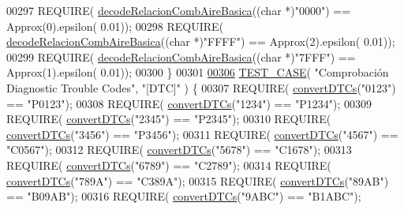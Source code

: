 \begin{DoxyCode}
{{{00297     REQUIRE( \hyperlink{decoders_8cpp_ade77bb9f8d8a2ba3aa431cdf9bdd0c32}{decodeRelacionCombAireBasica}((\textcolor{keywordtype}{char} *)\textcolor{stringliteral}{"0000"}) == Approx(0).epsilon(
      0.01));
00298     REQUIRE( \hyperlink{decoders_8cpp_ade77bb9f8d8a2ba3aa431cdf9bdd0c32}{decodeRelacionCombAireBasica}((\textcolor{keywordtype}{char} *)\textcolor{stringliteral}{"FFFF"}) == Approx(2).epsilon(
      0.01));
00299     REQUIRE( \hyperlink{decoders_8cpp_ade77bb9f8d8a2ba3aa431cdf9bdd0c32}{decodeRelacionCombAireBasica}((\textcolor{keywordtype}{char} *)\textcolor{stringliteral}{"7FFF"}) == Approx(1).epsilon(
      0.01));
00300 \}
00301 
\hyperlink{UnitTestCase_8cpp_a27f82a7800b27dd78331e6ee707cb5f8}{00306} \hyperlink{UnitTestCase_8cpp_ab1b7b485076e7de68cd9912827a8ee86}{TEST\_CASE}( \textcolor{stringliteral}{"Comprobación Diagnostic Trouble Codes"}, \textcolor{stringliteral}{"[DTC]"} ) \{
00307     REQUIRE( \hyperlink{decoders_8cpp_a4f18f411252f4c60fae4af320989c262}{convertDTCs}(\textcolor{stringliteral}{"0123"}) == \textcolor{stringliteral}{"P0123"});
00308     REQUIRE( \hyperlink{decoders_8cpp_a4f18f411252f4c60fae4af320989c262}{convertDTCs}(\textcolor{stringliteral}{"1234"}) == \textcolor{stringliteral}{"P1234"});
00309     REQUIRE( \hyperlink{decoders_8cpp_a4f18f411252f4c60fae4af320989c262}{convertDTCs}(\textcolor{stringliteral}{"2345"}) == \textcolor{stringliteral}{"P2345"});
00310     REQUIRE( \hyperlink{decoders_8cpp_a4f18f411252f4c60fae4af320989c262}{convertDTCs}(\textcolor{stringliteral}{"3456"}) == \textcolor{stringliteral}{"P3456"});
00311     REQUIRE( \hyperlink{decoders_8cpp_a4f18f411252f4c60fae4af320989c262}{convertDTCs}(\textcolor{stringliteral}{"4567"}) == \textcolor{stringliteral}{"C0567"});
00312     REQUIRE( \hyperlink{decoders_8cpp_a4f18f411252f4c60fae4af320989c262}{convertDTCs}(\textcolor{stringliteral}{"5678"}) == \textcolor{stringliteral}{"C1678"});
00313     REQUIRE( \hyperlink{decoders_8cpp_a4f18f411252f4c60fae4af320989c262}{convertDTCs}(\textcolor{stringliteral}{"6789"}) == \textcolor{stringliteral}{"C2789"});
00314     REQUIRE( \hyperlink{decoders_8cpp_a4f18f411252f4c60fae4af320989c262}{convertDTCs}(\textcolor{stringliteral}{"789A"}) == \textcolor{stringliteral}{"C389A"});
00315     REQUIRE( \hyperlink{decoders_8cpp_a4f18f411252f4c60fae4af320989c262}{convertDTCs}(\textcolor{stringliteral}{"89AB"}) == \textcolor{stringliteral}{"B09AB"});
00316     REQUIRE( \hyperlink{decoders_8cpp_a4f18f411252f4c60fae4af320989c262}{convertDTCs}(\textcolor{stringliteral}{"9ABC"}) == \textcolor{stringliteral}{"B1ABC"});
}}}
\end{DoxyCode}
